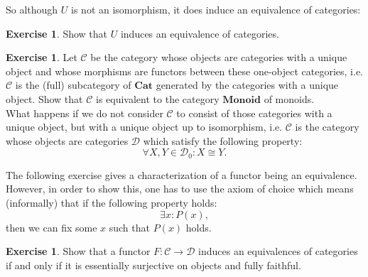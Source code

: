 \documentclass[a4paper,10pt]{scrartcl}
\newcommand{\onlydraft}[1]{} %
\renewcommand{\onlydraft}[1]{#1}  %
\theoremstyle{plain}
\theoremstyle{definition}
\newtheorem{exer}[thm]{Exercise}
\newcommand{\Cat}[1]{\mathcal{#1}}
\newcommand{\CC}{\Cat{C}}
\newcommand{\DD}{\Cat{D}}
\newcommand{\Catb}[1]{\mathbf{#1}}
\newcommand{\CAT}{\Catb{Cat}}
\newcommand{\MON}{\Catb{Monoid}}
\newcommand{\Ob}[1]{{#1}_0}
\begin{document}
So although $U$ is not an isomorphism, it does induce an equivalence of categories:
\begin{exer} Show that $U$ induces an equivalence of categories.
\end{exer}

\begin{exer} Let $\CC$ be the category whose objects are categories with a unique object and whose morphisms are functors between these one-object categories, i.e. $\CC$ is the (full) subcategory of $\CAT$ generated by the categories with a unique object. Show that $\CC$ is equivalent to the category $\MON$ of monoids. \\
What happens if we do not consider $\CC$ to consist of those categories with a unique object, but with a unique object up to isomorphism, i.e. $\CC$ is the category whose objects are categories $\DD$ which satisfy the following property: 
\[
\forall X,Y \in \Ob{\DD}: X\cong Y.
\]
\end{exer}

The following exercise gives a characterization of a functor being an equivalence. However, in order to show this, one has to use the axiom of choice which means (informally) that if the following property holds:
\[ 
\exists x: P(x),
\]
then we can fix some $x$ such that $P(x)$ holds.
\begin{exer} Show that a functor $F:\CC\to\DD$ induces an equivalences of categories if and only if it is essentially surjective on objects and fully faithful.
\end{exer}


\onlydraft{}

\onlydraft{}

\onlydraft{}




\appendix

\onlydraft{}

\onlydraft{}

\printbibliography
\end{document}

